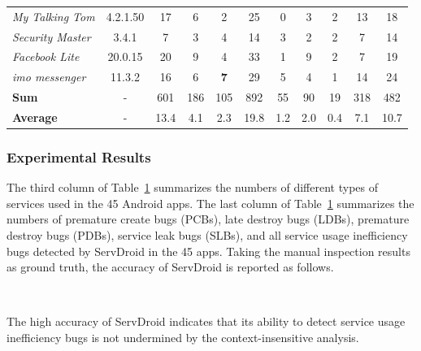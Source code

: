 \documentclass[sigconf,review, anonymous]{acmart}
\begin{document}
\begin{table}
\begin{tabular}{|l|c|cccc|ccccc|}
{\it My Talking Tom} & 4.2.1.50 & 17 & 6 & 2 & 25 & 0 & 3 & 2 & 13 & 18\\
{\it Security Master} & 3.4.1 & 7 & 3 & 4 & 14 & 3 & 2 & 2 & 7 & 14\\
{\it Facebook Lite} & 20.0.15 & 20 & 9 & 4 & 33 & 1 & 9 & 2 & 7 & 19 \\
{\it imo messenger} & 11.3.2 & 16 & 6 & {\bf 7} & 29 & 5 & 4 & 1 & 14 & 24\\
\hline
{\bf Sum} & - &  601  & 186  &  105  &  892 & 55 & 90 & 19 & 318 & 482\\
\hline
{\bf Average} & - & 13.4  &   4.1  &   2.3  &   19.8 & 1.2 & 2.0 & 0.4 & 7.1 & 10.7\\
\hline
\end{tabular}
\label{tab_resultsum}
\end{table}


\subsubsection{Experimental Results}

The third column of Table~\ref{tab_resultsum} summarizes the numbers
of different types of services used in the 45 Android apps. The last column of Table~\ref{tab_resultsum}
summarizes the numbers of premature create bugs (PCBs), late destroy bugs
(LDBs), premature destroy bugs (PDBs), service leak bugs (SLBs), and all service usage
inefficiency bugs detected by \textsf{ServDroid} in the 45 apps.
Taking the manual inspection results as ground truth, the
accuracy of \textsf{ServDroid} is reported as follows.

\medskip
{\setlength{\parindent}{0 em}
}\\
\medskip

The high accuracy of \textsf{ServDroid} indicates that its ability to detect
service usage inefficiency bugs is not undermined by the context-insensitive
analysis.
\end{document}
